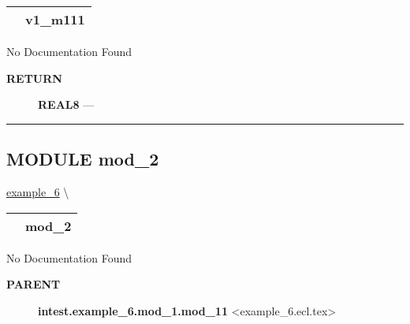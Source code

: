 {\renewcommand{\arraystretch}{1.5}
\begin{tabularx}{\textwidth}{|>{\raggedright\arraybackslash}l|X|}
\hline
\hspace{0pt}\mytexttt{\color{red} } & \textbf{v1\_m111} \\
\hline
\end{tabularx}
}

\par





No Documentation Found








\par
\begin{description}
\item [\colorbox{tagtype}{\color{white} \textbf{\textsf{RETURN}}}] \textbf{REAL8} --- 
\end{description}




\rule{\linewidth}{0.5pt}






\subsection*{\textsf{\colorbox{headtoc}{\color{white} MODULE}
mod\_2}}

\hypertarget{ecldoc:intest.example_6.mod_2}{}
\hspace{0pt} \hyperlink{ecldoc:intest.example_6}{example_6} \textbackslash 

{\renewcommand{\arraystretch}{1.5}
\begin{tabularx}{\textwidth}{|>{\raggedright\arraybackslash}l|X|}
\hline
\hspace{0pt}\mytexttt{\color{red} } & \textbf{mod\_2} \\
\hline
\end{tabularx}
}

\par





No Documentation Found










\par
\begin{description}
\item [\colorbox{tagtype}{\color{white} \textbf{\textsf{PARENT}}}] \textbf{intest.example\_6.mod\_1.mod\_11} <example\_6.ecl.tex>
\end{description}


